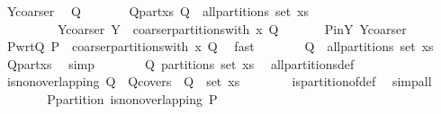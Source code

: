 \begin{isabellebody}
\ Y{\isacharunderscore}coarser\ \isamarkupfalse%
\ Q\isanewline
\ \ \ \ \ \ \ Q{\isacharunderscore}part{\isacharunderscore}xs{\isacharcolon}\ {\isachardoublequoteopen}Q\ {\isasymin}\ all{\isacharunderscore}partitions\ {\isacharparenleft}set\ xs{\isacharparenright}{\isachardoublequoteclose}\isanewline
\ \ \ \ \ \ \ \ \ Y{\isacharunderscore}coarser{\isacharprime}{\isacharcolon}\ {\isachardoublequoteopen}Y\ {\isacharequal}\ coarser{\isacharunderscore}partitions{\isacharunderscore}with\ x\ Q{\isachardoublequoteclose}\ \isacommand{{\isachardot}{\isachardot}}\isamarkupfalse%
\isanewline
\ \ \ \ \isamarkupfalse%
\ P{\isacharunderscore}in{\isacharunderscore}Y\ Y{\isacharunderscore}coarser{\isacharprime}\ \isamarkupfalse%
\ P{\isacharunderscore}wrt{\isacharunderscore}Q{\isacharcolon}\ {\isachardoublequoteopen}P\ {\isasymin}\ coarser{\isacharunderscore}partitions{\isacharunderscore}with\ x\ Q{\isachardoublequoteclose}\ \isamarkupfalse%
\ fast\isanewline
\ \ \ \ \isamarkupfalse%
\ \isamarkupfalse%
\ {\isachardoublequoteopen}Q\ {\isasymin}\ all{\isacharunderscore}partitions\ {\isacharparenleft}set\ xs{\isacharparenright}{\isachardoublequoteclose}\ \isamarkupfalse%
\ Q{\isacharunderscore}part{\isacharunderscore}xs\ \isamarkupfalse%
\ simp\isanewline
\ \ \ \ \isamarkupfalse%
\ \isamarkupfalse%
\ {\isachardoublequoteopen}Q\ partitions\ {\isacharparenleft}set\ xs{\isacharparenright}{\isachardoublequoteclose}\ \isamarkupfalse%
\ all{\isacharunderscore}partitions{\isacharunderscore}def\ \isacommand{{\isachardot}{\isachardot}}\isamarkupfalse%
\isanewline
\ \ \ \ \isamarkupfalse%
\ \isamarkupfalse%
\ {\isachardoublequoteopen}is{\isacharunderscore}non{\isacharunderscore}overlapping\ Q{\isachardoublequoteclose}\ \ Q{\isacharunderscore}covers{\isacharcolon}\ {\isachardoublequoteopen}{\isasymUnion}\ Q\ {\isacharequal}\ set\ xs{\isachardoublequoteclose}\isanewline
\ \ \ \ \ \ \isamarkupfalse%
\ is{\isacharunderscore}partition{\isacharunderscore}of{\isacharunderscore}def\ \isamarkupfalse%
\ simp{\isacharunderscore}all\isanewline
\ \ \ \ \isamarkupfalse%
\ \isamarkupfalse%
\ P{\isacharunderscore}partition{\isacharcolon}\ {\isachardoublequoteopen}is{\isacharunderscore}non{\isacharunderscore}overlapping\ P{\isachardoublequoteclose}\isanewline

\end{isabellebody}

